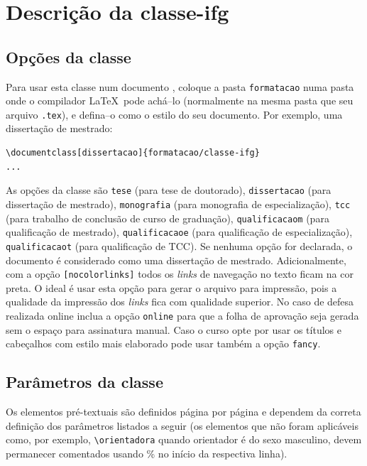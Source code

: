 \chapter{Descrição da \textsf{classe-ifg}}
\label{cap:descr}

\section{Opções da classe}
\label{sec:opcoes}
Para usar esta classe num documento \LaTeXe, coloque a pasta \verb|formatacao| numa pasta onde o compilador \LaTeX\ pode achá--lo (normalmente na mesma pasta que seu arquivo \verb|.tex|), e defina--o como o estilo do seu documento. Por exemplo, uma dissertação de mestrado:
\begin{verbatim}
\documentclass[dissertacao]{formatacao/classe-ifg}
...

\end{verbatim}

As opções da classe são \verb|tese| (para tese de doutorado), \verb|dissertacao| (para dissertação de mestrado), \verb|monografia| (para monografia de especialização), \verb|tcc| (para trabalho de conclusão de curso de graduação), \verb|qualificacaom| (para qualificação de mestrado), \verb|qualificacaoe| (para qualificação de especialização), \verb|qualificacaot| (para qualificação de TCC). Se nenhuma opção for declarada, o documento é considerado como uma dissertação de mestrado. Adicionalmente, com a opção \verb|[nocolorlinks]| todos os {\em links} de navegação no texto ficam na cor preta. O ideal é usar esta opção para gerar o arquivo para impressão, pois a qualidade da impressão dos {\em links} fica com qualidade superior. No caso de defesa realizada online inclua a opção \verb|online| para que a folha de aprovação seja gerada sem o espaço para assinatura manual. Caso o curso opte por usar os títulos e cabeçalhos com estilo mais elaborado pode usar também a opção \verb|fancy|.


\section{Parâmetros da classe}
\label{sec:param}
Os elementos pré-textuais são definidos página por página e dependem da correta definição dos parâmetros listados a seguir (os elementos que não foram aplicáveis como, por exemplo, \verb|\orientadora| quando orientador é do sexo masculino, devem permanecer comentados usando \% no início da respectiva linha).


